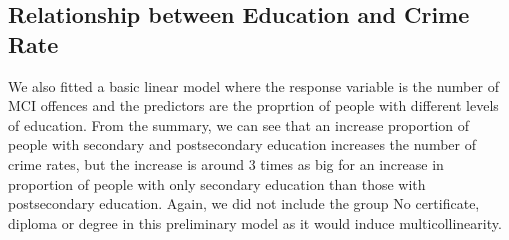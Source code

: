 \documentclass[
]{article}
\begin{document}
\hypertarget{relationship-between-education-and-crime-rate}{%
\subsection{Relationship between Education and Crime
Rate}\label{relationship-between-education-and-crime-rate}}

We also fitted a basic linear model where the response variable is the
number of MCI offences and the predictors are the proprtion of people
with different levels of education. From the summary, we can see that an
increase proportion of people with secondary and postsecondary education
increases the number of crime rates, but the increase is around 3 times
as big for an increase in proportion of people with only secondary
education than those with postsecondary education. Again, we did not
include the group No certificate, diploma or degree in this preliminary
model as it would induce multicollinearity.
\end{document}
